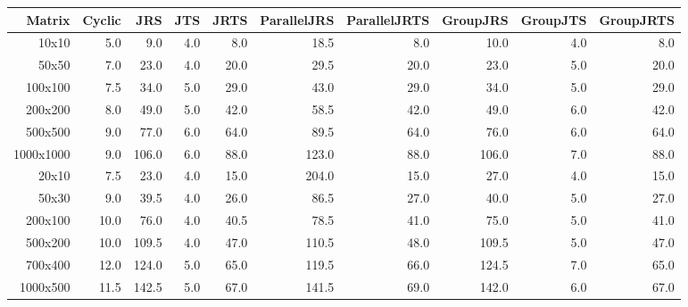 \begin{tabular}{rrrrrrrrrr}
\toprule
Matrix & Cyclic & JRS & JTS & JRTS & ParallelJRS & ParallelJRTS & GroupJRS & GroupJTS & GroupJRTS \\
\midrule
10x10 & 5.0 & 9.0 & 4.0 & 8.0 & 18.5 & 8.0 & 10.0 & 4.0 & 8.0 \\
50x50 & 7.0 & 23.0 & 4.0 & 20.0 & 29.5 & 20.0 & 23.0 & 5.0 & 20.0 \\
100x100 & 7.5 & 34.0 & 5.0 & 29.0 & 43.0 & 29.0 & 34.0 & 5.0 & 29.0 \\
200x200 & 8.0 & 49.0 & 5.0 & 42.0 & 58.5 & 42.0 & 49.0 & 6.0 & 42.0 \\
500x500 & 9.0 & 77.0 & 6.0 & 64.0 & 89.5 & 64.0 & 76.0 & 6.0 & 64.0 \\
1000x1000 & 9.0 & 106.0 & 6.0 & 88.0 & 123.0 & 88.0 & 106.0 & 7.0 & 88.0 \\
\midrule
20x10 & 7.5 & 23.0 & 4.0 & 15.0 & 204.0 & 15.0 & 27.0 & 4.0 & 15.0 \\
50x30 & 9.0 & 39.5 & 4.0 & 26.0 & 86.5 & 27.0 & 40.0 & 5.0 & 27.0 \\
200x100 & 10.0 & 76.0 & 4.0 & 40.5 & 78.5 & 41.0 & 75.0 & 5.0 & 41.0 \\
500x200 & 10.0 & 109.5 & 4.0 & 47.0 & 110.5 & 48.0 & 109.5 & 5.0 & 47.0 \\
700x400 & 12.0 & 124.0 & 5.0 & 65.0 & 119.5 & 66.0 & 124.5 & 7.0 & 65.0 \\
1000x500 & 11.5 & 142.5 & 5.0 & 67.0 & 141.5 & 69.0 & 142.0 & 6.0 & 67.0 \\
\bottomrule
\end{tabular}
